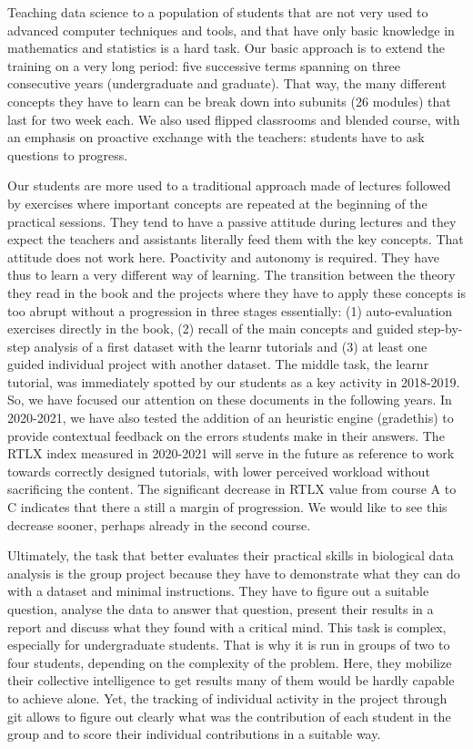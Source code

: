 \documentclass[
]{article}
\begin{document}
Teaching data science to a population of students that are not very used
to advanced computer techniques and tools, and that have only basic
knowledge in mathematics and statistics is a hard task. Our basic
approach is to extend the training on a very long period: five
successive terms spanning on three consecutive years (undergraduate and
graduate). That way, the many different concepts they have to learn can
be break down into subunits (26 modules) that last for two week each. We
also used flipped classrooms and blended course, with an emphasis on
proactive exchange with the teachers: students have to ask questions to
progress.

Our students are more used to a traditional approach made of lectures
followed by exercises where important concepts are repeated at the
beginning of the practical sessions. They tend to have a passive
attitude during lectures and they expect the teachers and assistants
literally feed them with the key concepts. That attitude does not work
here. Poactivity and autonomy is required. They have thus to learn a
very different way of learning. The transition between the theory they
read in the book and the projects where they have to apply these
concepts is too abrupt without a progression in three stages
essentially: (1) auto-evaluation exercises directly in the book, (2)
recall of the main concepts and guided step-by-step analysis of a first
dataset with the learnr tutorials and (3) at least one guided individual
project with another dataset. The middle task, the learnr tutorial, was
immediately spotted by our students as a key activity in 2018-2019. So,
we have focused our attention on these documents in the following years.
In 2020-2021, we have also tested the addition of an heuristic engine
(gradethis) to provide contextual feedback on the errors students make
in their answers. The RTLX index measured in 2020-2021 will serve in the
future as reference to work towards correctly designed tutorials, with
lower perceived workload without sacrificing the content. The
significant decrease in RTLX value from course A to C indicates that
there a still a margin of progression. We would like to see this
decrease sooner, perhaps already in the second course.

Ultimately, the task that better evaluates their practical skills in
biological data analysis is the group project because they have to
demonstrate what they can do with a dataset and minimal instructions.
They have to figure out a suitable question, analyse the data to answer
that question, present their results in a report and discuss what they
found with a critical mind. This task is complex, especially for
undergraduate students. That is why it is run in groups of two to four
students, depending on the complexity of the problem. Here, they
mobilize their collective intelligence to get results many of them would
be hardly capable to achieve alone. Yet, the tracking of individual
activity in the project through git allows to figure out clearly what
was the contribution of each student in the group and to score their
individual contributions in a suitable way.
\end{document}
